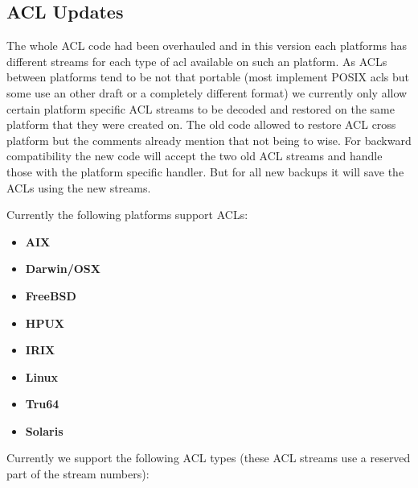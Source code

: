 \subsection{ACL Updates}
The whole ACL code had been overhauled and in this version each platforms has
different streams for each type of acl available on such an platform. As ACLs
between platforms tend to be not that portable (most implement POSIX acls but
some use an other draft or a completely different format) we currently only
allow certain platform specific ACL streams to be decoded and restored on the
same platform that they were created on.  The old code allowed to restore ACL
cross platform but the comments already mention that not being to wise. For
backward compatibility the new code will accept the two old ACL streams and
handle those with the platform specific handler. But for all new backups it
will save the ACLs using the new streams.

Currently the following platforms support ACLs:

\begin{itemize}
 \item {\bf AIX}
 \item {\bf Darwin/OSX}
 \item {\bf FreeBSD}
 \item {\bf HPUX}
 \item {\bf IRIX}
 \item {\bf Linux}
 \item {\bf Tru64}
 \item {\bf Solaris}
\end{itemize}

Currently we support the following ACL types (these ACL streams use a reserved
part of the stream numbers):

